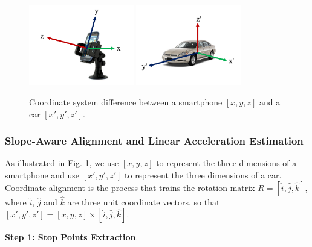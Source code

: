 

\begin{figure}[!tbph]
\vspace{0.0cm}
\hspace{-0.5cm}
\includegraphics[width=1.8in,angle=0]{Figs/DriveSense/phone3d.pdf}
\vspace{0.0cm}
\hspace{-1.0cm}
\includegraphics[width=1.8in,angle=0]{Figs/DriveSense/car3d.pdf}
\vspace{-0.2cm}
\caption{Coordinate system difference between a smartphone $[x, y, z]$ and a car $[x', y', z']$.}
\vspace{0.2cm}
\label{coordinates}
\end{figure}


\subsubsection{Slope-Aware Alignment and Linear Acceleration Estimation}


As illustrated in Fig. \ref{coordinates}, we use 
$[x, y, z]$ to represent the three dimensions of a smartphone
and use $[x', y', z']$ to represent the three dimensions
of a car. 
Coordinate alignment is the process that trains the rotation
matrix $R = [\hat{i}, \hat{j}, \hat{k}]$, 
where $\hat{i}$, $\hat{j}$ and $\hat{k}$ are three unit coordinate vectors,
so that $[x', y', z'] = [x, y, z] \times [\hat{i}, \hat{j}, \hat{k}]$.




\textbf{Step 1: Stop Points Extraction}. 


